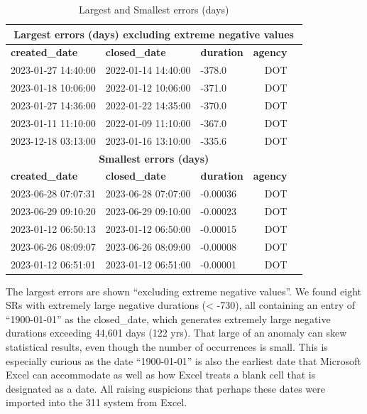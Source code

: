 \documentclass[12pt, titlepage]{article}
\begin{document}
	\begin{table}[tbp]
	    \centering
	    \caption{Largest and Smallest errors (days)}
		    \begin{tabular}{l l l r l}
		        \toprule
		        \multicolumn{5}{c}{\textbf{Largest errors (days) excluding 
		        extreme negative values}} \\
		        \midrule
		        \textbf{created\_date} & \textbf{closed\_date} & \textbf{duration} 
		        & \textbf{agency} \\
			        \midrule
			        2023-01-27 14:40:00 & 2022-01-14 14:40:00 & -378.0 & DOT \\
			        2023-01-18 10:06:00 & 2022-01-12 10:06:00 & -371.0 & DOT \\
			        2023-01-27 14:36:00 & 2022-01-22 14:35:00 & -370.0 & DOT \\
			        2023-01-11 11:10:00 & 2022-01-09 11:10:00 & -367.0 & DOT \\
			        2023-12-18 03:13:00 & 2023-01-16 13:10:00 & -335.6 & DOT \\
			        \midrule
			        \multicolumn{5}{c}{\textbf{Smallest errors (days)}} \\
			        \midrule
			        \textbf{created\_date} & \textbf{closed\_date} & \textbf{duration} 
			        & \textbf{agency} \\
			        \midrule
			        2023-06-28 07:07:31 & 2023-06-28 07:07:00 & -0.00036 & DOT \\
			        2023-06-29 09:10:20 & 2023-06-29 09:10:00 & -0.00023 & DOT \\
			        2023-01-12 06:50:13 & 2023-01-12 06:50:00 & -0.00015 & DOT \\
			        2023-06-26 08:09:07 & 2023-06-26 08:09:00 & -0.00008 & DOT \\
			        2023-01-12 06:51:01 & 2023-01-12 06:51:00 & -0.00001 & DOT \\
			        \bottomrule
		    \end{tabular}
	    \label{tab:combined_errors}
	\end{table}
	
	The largest errors are shown ``excluding extreme negative values''. We found 
	eight SRs with extremely large negative durations (\textless{} -730), all containing 
	an entry of ``1900-01-01'' as the closed\_date, which generates extremely large 
	negative durations exceeding 44,601 days (122 yrs). That large of an anomaly 
	can skew statistical results, even though the number of occurrences is small. 
	This is especially curious as the date ``1900-01-01'' is also the earliest date that 
	Microsoft Excel can accommodate as well as how Excel treats a blank cell 
	that is designated as a date. All raising suspicions that perhaps these dates 
	were imported into the 311 system from Excel.
	
\end{document}
